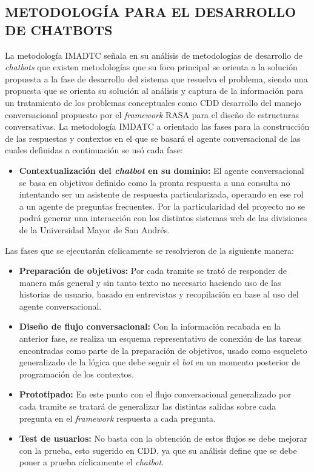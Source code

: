 \documentclass[letter, openright, 12pt]{book}
\begin{document}
\subsection{METODOLOGÍA PARA EL DESARROLLO DE CHATBOTS}
La metodología IMADTC señala en su análisis de metodologías de desarrollo de \textit{chatbots} que existen metodologías que su foco principal se orienta a la solución propuesta a la fase de desarrollo del sistema que resuelva el problema, siendo una propuesta que se orienta su solución al análisis y captura de la información para un tratamiento de los problemas conceptuales como CDD desarrollo del manejo conversacional propuesto por el \textit{framework} RASA para el diseño de estructuras conversativas. La metodología IMDATC a orientado las fases para la construcción de las respuestas y contextos en el que se basará el agente conversacional de las cuales definidas a continuación se usó cada fase:

\begin{itemize}
\item \textbf{Contextualización del \textit{chatbot} en su dominio:} El agente conversacional se basa en objetivos definido como la pronta respuesta a una consulta no intentando ser un asistente de respuesta particularizada, operando en ese rol a un agente de preguntas frecuentes. Por la particularidad del proyecto no se podrá generar una interacción con los distintos sistemas web de las divisiones de la Universidad Mayor de San Andrés. 
\end{itemize}
Las fases que se ejecutarán cíclicamente se resolvieron de la siguiente manera:
\begin{itemize}
\item \textbf{Preparación de objetivos:} Por cada tramite se trató de responder de manera más general y sin tanto texto no necesario haciendo uso de las historias de usuario, basado en entrevistas y recopilación en base al uso del agente conversacional. 
\item \textbf{Diseño de flujo conversacional:} Con la información recabada en la anterior fase, se realiza un esquema representativo de conexión de las tareas encontradas como parte de la preparación de objetivos, usado como esqueleto generalizado de la lógica que debe seguir el \textit{bot} en un momento posterior de programación de los contextos.
\item \textbf{Prototipado:} En este punto con el flujo conversacional generalizado por cada tramite se tratará de generalizar las distintas salidas sobre cada pregunta en el \textit{framework} respuesta a cada pregunta. 
\item \textbf{Test de usuarios:} No basta con la obtención de estos flujos se debe mejorar con la prueba, esto sugerido en CDD, ya que su análisis define que se debe poner a prueba cíclicamente el \textit{chatbot}.
\end{itemize}
\end{document}
